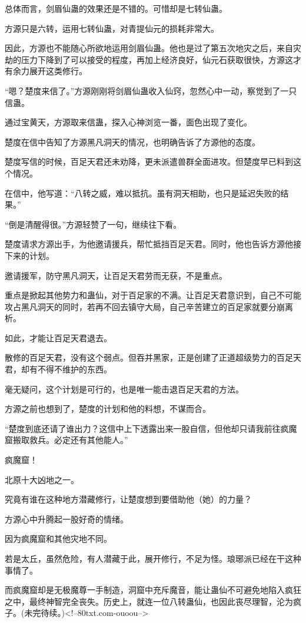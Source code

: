 \begin{this_body}
总体而言，剑眉仙蛊的效果还是不错的。可惜却是七转仙蛊。

方源只是六转，运用七转仙蛊，对青提仙元的损耗非常大。

因此，方源也不能随心所欲地运用剑眉仙蛊。他也是过了第五次地灾之后，来自灾劫的压力下降到了可以接受的程度，再加上经济良好，仙元石获取很快，方源这才有余力展开这类修行。

“嗯？楚度来信了。”方源刚刚将剑眉仙蛊收入仙窍，忽然心中一动，察觉到了一只信蛊。

通过宝黄天，方源取来信蛊，探入心神浏览一番，面色出现了变化。

楚度在信中告知了方源黑凡洞天的情况，也明确告诉了方源他的态度。

楚度写信的时候，百足天君还未劝降，更未派遣兽群全面进攻。但楚度早已料到这个情况。

在信中，他写道：“八转之威，难以抵抗。虽有洞天相助，也只是延迟失败的结果。”

“倒是清醒得很。”方源轻赞了一句，继续往下看。

楚度请求方源出手，为他邀请援兵，帮忙抵挡百足天君。同时，他也告诉方源他接下来的计划。

邀请援军，防守黑凡洞天，让百足天君劳而无获，不是重点。

重点是掀起其他势力和蛊仙，对于百足家的不满。让百足天君意识到，自己不可能攻占黑凡洞天的同时，若再不回去镇守大局，自己辛苦建立的百足家就要分崩离析。

如此，才能让百足天君退去。

散修的百足天君，没有这个弱点。但吞并黑家，正是创建了正道超级势力的百足天君，却有不得不维护的东西。

毫无疑问，这个计划是可行的，也是唯一能击退百足天君的方法。

方源之前也想到了，楚度的计划和他的料想，不谋而合。

“楚度到底还请了谁出力？这信中上下透露出来一股自信，但他却只请我前往疯魔窟搬取救兵。必定还有其他能人。”

疯魔窟！

北原十大凶地之一。

究竟有谁在这种地方潜藏修行，让楚度想到要借助他（她）的力量？

方源心中升腾起一股好奇的情绪。

因为疯魔窟和其他灾地不同。

若是太丘，虽然危险，有人潜藏于此，展开修行，不足为怪。琅琊派已经在干这种事情了。

而疯魔窟却是无极魔尊一手制造，洞窟中充斥魔音，能让蛊仙不可避免地陷入疯狂之中，最终神智完全丧失。历史上，就连一位八转蛊仙，也因此丧尽理智，沦为疯子。(未完待续。)<!--80txt.com-ouoou-->

\end{this_body}

